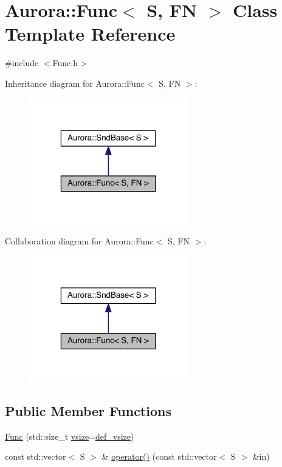 \hypertarget{class_aurora_1_1_func}{}\section{Aurora\+:\+:Func$<$ S, FN $>$ Class Template Reference}
\label{class_aurora_1_1_func}


{\ttfamily \#include $<$Func.\+h$>$}



Inheritance diagram for Aurora\+:\+:Func$<$ S, FN $>$\+:\nopagebreak
\begin{figure}[H]
\begin{center}
\leavevmode
\includegraphics[width=196pt]{class_aurora_1_1_func__inherit__graph}
\end{center}
\end{figure}


Collaboration diagram for Aurora\+:\+:Func$<$ S, FN $>$\+:\nopagebreak
\begin{figure}[H]
\begin{center}
\leavevmode
\includegraphics[width=196pt]{class_aurora_1_1_func__coll__graph}
\end{center}
\end{figure}
\subsection*{Public Member Functions}
\begin{DoxyCompactItemize}
\item 
\hyperlink{class_aurora_1_1_func_a2a97c0f4eaf70c7e922876debeb14abe}{Func} (std\+::size\+\_\+t \hyperlink{class_aurora_1_1_snd_base_af9e21aaf411b17f7a8221c991ce5d291}{vsize}=\hyperlink{namespace_aurora_afaaddf667a06e7ce23c667a8b7295263}{def\+\_\+vsize})
\item 
const std\+::vector$<$ S $>$ \& \hyperlink{class_aurora_1_1_func_aa7664032aef8be96cdfd33b968a1f226}{operator()} (const std\+::vector$<$ S $>$ \&in)
\end{DoxyCompactItemize}


